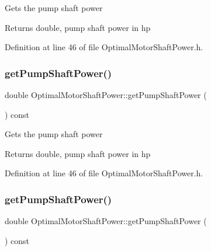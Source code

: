 Gets the pump shaft power

\begin{DoxyReturn}{Returns}
double, pump shaft power in hp 
\end{DoxyReturn}


Definition at line 46 of file Optimal\+Motor\+Shaft\+Power.\+h.

\mbox{\label{class_optimal_motor_shaft_power_aca7bb632c659ecf2ebf3cb9fdb23626f}} 
\subsubsection{\texorpdfstring{get\+Pump\+Shaft\+Power()}{getPumpShaftPower()}\hspace{0.1cm}{\footnotesize\ttfamily [2/3]}}
{\footnotesize\ttfamily double Optimal\+Motor\+Shaft\+Power\+::get\+Pump\+Shaft\+Power (\begin{DoxyParamCaption}{ }\end{DoxyParamCaption}) const\hspace{0.3cm}{\ttfamily [inline]}}

Gets the pump shaft power

\begin{DoxyReturn}{Returns}
double, pump shaft power in hp 
\end{DoxyReturn}


Definition at line 46 of file Optimal\+Motor\+Shaft\+Power.\+h.

\mbox{\label{class_optimal_motor_shaft_power_aca7bb632c659ecf2ebf3cb9fdb23626f}} 
\subsubsection{\texorpdfstring{get\+Pump\+Shaft\+Power()}{getPumpShaftPower()}\hspace{0.1cm}{\footnotesize\ttfamily [3/3]}}
{\footnotesize\ttfamily double Optimal\+Motor\+Shaft\+Power\+::get\+Pump\+Shaft\+Power (\begin{DoxyParamCaption}{ }\end{DoxyParamCaption}) const\hspace{0.3cm}{\ttfamily [inline]}}

